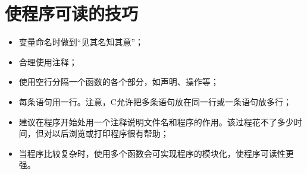 \section{使程序可读的技巧}
\begin{frame}[fragile]
\begin{itemize}
\item 变量命名时做到“见其名知其意”；\\[0.1in]
\item 合理使用注释；\\[0.1in]
\item 使用空行分隔一个函数的各个部分，如声明、操作等；\\[0.1in]
\item 每条语句用一行。注意，C允许把多条语句放在同一行或一条语句放多行；\\[0.1in]
\item 建议在程序开始处用一个注释说明文件名和程序的作用。该过程花不了多少时间，但对以后浏览或打印程序很有帮助；\\[.1in]
\item 当程序比较复杂时，使用多个函数会可实现程序的模块化，使程序可读性更强。
\end{itemize}
\end{frame}







